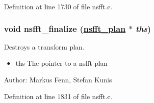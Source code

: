 Definition at line 1730 of file nsfft.c.\hypertarget{group__nsfft_ga7}{
\subsubsection[nsfft\_\-finalize]{\setlength{\rightskip}{0pt plus 5cm}void nsfft\_\-finalize (\hyperlink{structnsfft__plan}{nsfft\_\-plan} $\ast$ {\em ths})}}
\label{group__nsfft_ga7}


Destroys a transform plan. 

\begin{itemize}
\item ths The pointer to a nsfft plan\end{itemize}
\begin{Desc}
\item[Author:]Markus Fenn, Stefan Kunis \end{Desc}


Definition at line 1831 of file nsfft.c.
